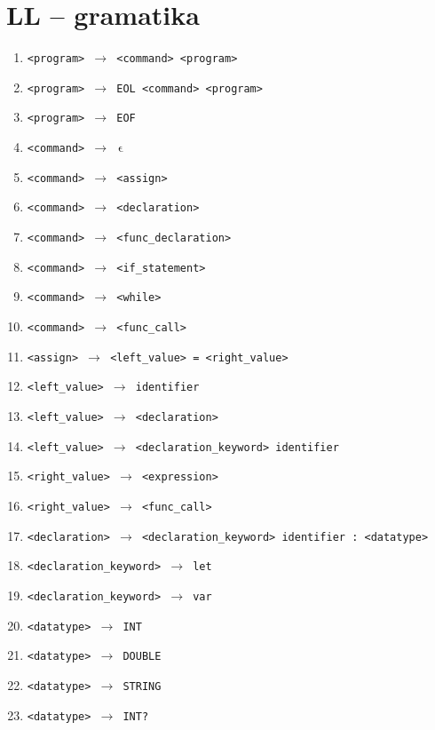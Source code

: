 \documentclass[a4paper, 11pt]{article}
\begin{document}
	\section*{LL -- gramatika}
	{ \fontsize{10}{12}\selectfont 
	\begin{enumerate}[noitemsep]
		
		\item \texttt{<program> $\rightarrow$ <command> <program>}
		\item \texttt{<program> $\rightarrow$ EOL <command> <program>}
		\item \texttt{<program> $\rightarrow$ EOF}
		\item \texttt{<command> $\rightarrow\,\,\upvarepsilon$}
		\item \texttt{<command> $\rightarrow$ <assign>}
		\item \texttt{<command> $\rightarrow$ <declaration>}
		\item \texttt{<command> $\rightarrow$ <func\_declaration>}
		\item \texttt{<command> $\rightarrow$ <if\_statement>}
		\item \texttt{<command> $\rightarrow$ <while>}
		\item \texttt{<command> $\rightarrow$ <func\_call>}
		\item \texttt{<assign> $\rightarrow$ <left\_value> = <right\_value>}
		\item \texttt{<left\_value> $\rightarrow$ identifier}
		\item \texttt{<left\_value> $\rightarrow$ <declaration>}
		\item \texttt{<left\_value> $\rightarrow$ <declaration\_keyword> identifier}
		\item \texttt{<right\_value> $\rightarrow$ <expression>}
		\item \texttt{<right\_value> $\rightarrow$ <func\_call>}
		\item \texttt{<declaration> $\rightarrow$ <declaration\_keyword> identifier : <datatype>}
		\item \texttt{<declaration\_keyword> $\rightarrow$ let}
		\item \texttt{<declaration\_keyword> $\rightarrow$ var}
		\item \texttt{<datatype> $\rightarrow$ INT}
		\item \texttt{<datatype> $\rightarrow$ DOUBLE}
		\item \texttt{<datatype> $\rightarrow$ STRING}
		\item \texttt{<datatype> $\rightarrow$ INT?}

\end{enumerate}}
\end{document}
